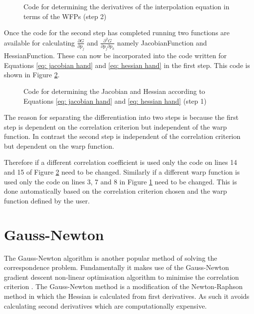 \documentclass[12pt,oneside,openany,a4paper, %
english, %
masters-t, goldenblock]{usthesis}
\begin{document}
\begin{figure}

\caption{Code for determining the derivatives of the interpolation equation in terms of the WFPs (step 2)}
\label{code:dgdp}
\end{figure}

Once the code for the second step has completed running two functions are available for calculating $\frac{\partial G}{\partial p_j}$ and $\frac{\partial^2 G}{\partial p_j \partial p_k}$ namely JacobianFunction and HessianFunction. These can now be incorporated into the code written for Equations \ref{eq: jacobian hand} and \ref{eq: hessian hand} in the first step. This code is shown in Figure \ref{code:jac hess}.

\begin{figure}

\caption{Code for determining the Jacobian and Hessian according to Equations \ref{eq: jacobian hand} and \ref{eq: hessian hand} (step 1)}
\label{code:jac hess}
\end{figure}

The reason for separating the differentiation into two steps is because the first step is dependent on the correlation criterion but independent of the warp function. In contrast the second step is independent of the correlation criterion but dependent on the warp function.

Therefore if a different correlation coefficient is used only the code on lines 14 and 15 of Figure \ref{code:jac hess} need to be changed. Similarly if a different warp function is used only the code on lines 3, 7 and 8 in Figure \ref{code:dgdp} need to be changed. This is done automatically based on the correlation criterion chosen and the warp function defined by the user.


\section{Gauss-Newton}
The Gauss-Newton algorithm is another popular method of solving the correspondence problem. Fundamentally it makes use of the Gauss-Newton gradient descent non-linear optimisation algorithm to minimise the correlation criterion \cite{lucasUnifying}. The Gauss-Newton method is a modification of the Newton-Raphson method in which the Hessian is calculated from first derivatives. As such it avoids calculating second derivatives which are computationally expensive.
\end{document}
